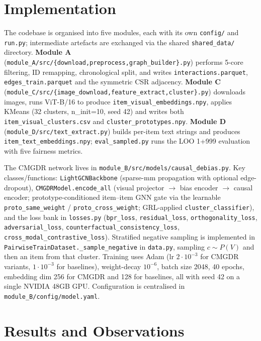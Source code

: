 \documentclass[12pt,a4paper]{article}
\begin{document}
\section{Implementation}
The codebase is organised into five modules, each with its own \texttt{config/} and
\texttt{run.py}; intermediate artefacts are exchanged via the shared
\texttt{shared\_data/} directory.
\textbf{Module A} (\texttt{module\_A/src/\{download,preprocess,graph\_builder\}.py})
performs 5-core filtering, ID remapping, chronological split, and writes
\texttt{interactions.parquet}, \texttt{edges\_train.parquet} and the symmetric CSR
adjacency. \textbf{Module C}
(\texttt{module\_C/src/\{image\_download,feature\_extract,cluster\}.py}) downloads
images, runs ViT-B/16 to produce \texttt{item\_visual\_embeddings.npy}, applies
KMeans (32 clusters, n\_init=10, seed 42) and writes both
\texttt{item\_visual\_clusters.csv} and \texttt{cluster\_prototypes.npy}.
\textbf{Module D} (\texttt{module\_D/src/text\_extract.py}) builds per-item text
strings and produces \texttt{item\_text\_embeddings.npy}; \texttt{eval\_sampled.py}
runs the LOO 1+999 evaluation with five fairness metrics.

The CMGDR network lives in \texttt{module\_B/src/models/causal\_debias.py}. Key
classes/functions: \verb|LightGCNBackbone| (sparse-mm propagation with optional
edge-dropout), \verb|CMGDRModel.encode_all| (visual projector $\!\to\!$ bias encoder
$\!\to\!$ causal encoder; prototype-conditioned item--item GNN gate via the learnable
\verb|proto_same_weight| / \verb|proto_cross_weight|; GRL-applied
\verb|cluster_classifier|), and the loss bank in \texttt{losses.py}
(\verb|bpr_loss|, \verb|residual_loss|, \verb|orthogonality_loss|,
\verb|adversarial_loss|, \verb|counterfactual_consistency_loss|,
\verb|cross_modal_contrastive_loss|). Stratified negative sampling is implemented in
\verb|PairwiseTrainDataset._sample_negative| in \texttt{data.py}, sampling
$c\!\sim\!P(V)$ and then an item from that cluster.
Training uses Adam (lr $2{\cdot}10^{-3}$ for CMGDR variants, $1{\cdot}10^{-3}$ for
baselines), weight-decay $10^{-6}$, batch size 2048, 40 epochs, embedding dim 256
for CMGDR and 128 for baselines, all with seed 42 on a single NVIDIA 48GB GPU.
Configuration is centralised in \texttt{module\_B/config/model.yaml}.

\section{Results and Observations}
\end{document}
